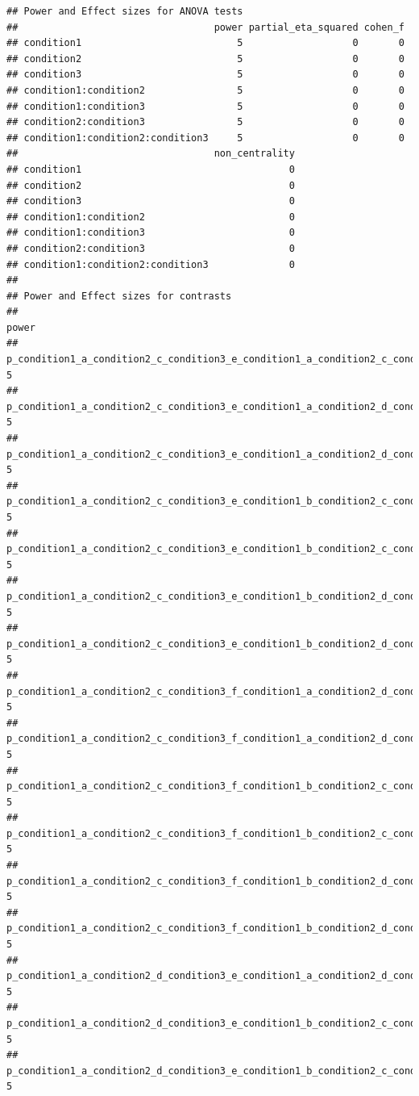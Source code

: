 \documentclass[]{book}
\begin{document}
\begin{verbatim}
## Power and Effect sizes for ANOVA tests
##                                  power partial_eta_squared cohen_f
## condition1                           5                   0       0
## condition2                           5                   0       0
## condition3                           5                   0       0
## condition1:condition2                5                   0       0
## condition1:condition3                5                   0       0
## condition2:condition3                5                   0       0
## condition1:condition2:condition3     5                   0       0
##                                  non_centrality
## condition1                                    0
## condition2                                    0
## condition3                                    0
## condition1:condition2                         0
## condition1:condition3                         0
## condition2:condition3                         0
## condition1:condition2:condition3              0
## 
## Power and Effect sizes for contrasts
##                                                                                 power
## p_condition1_a_condition2_c_condition3_e_condition1_a_condition2_c_condition3_f     5
## p_condition1_a_condition2_c_condition3_e_condition1_a_condition2_d_condition3_e     5
## p_condition1_a_condition2_c_condition3_e_condition1_a_condition2_d_condition3_f     5
## p_condition1_a_condition2_c_condition3_e_condition1_b_condition2_c_condition3_e     5
## p_condition1_a_condition2_c_condition3_e_condition1_b_condition2_c_condition3_f     5
## p_condition1_a_condition2_c_condition3_e_condition1_b_condition2_d_condition3_e     5
## p_condition1_a_condition2_c_condition3_e_condition1_b_condition2_d_condition3_f     5
## p_condition1_a_condition2_c_condition3_f_condition1_a_condition2_d_condition3_e     5
## p_condition1_a_condition2_c_condition3_f_condition1_a_condition2_d_condition3_f     5
## p_condition1_a_condition2_c_condition3_f_condition1_b_condition2_c_condition3_e     5
## p_condition1_a_condition2_c_condition3_f_condition1_b_condition2_c_condition3_f     5
## p_condition1_a_condition2_c_condition3_f_condition1_b_condition2_d_condition3_e     5
## p_condition1_a_condition2_c_condition3_f_condition1_b_condition2_d_condition3_f     5
## p_condition1_a_condition2_d_condition3_e_condition1_a_condition2_d_condition3_f     5
## p_condition1_a_condition2_d_condition3_e_condition1_b_condition2_c_condition3_e     5
## p_condition1_a_condition2_d_condition3_e_condition1_b_condition2_c_condition3_f     5

\end{verbatim}
\end{document}
